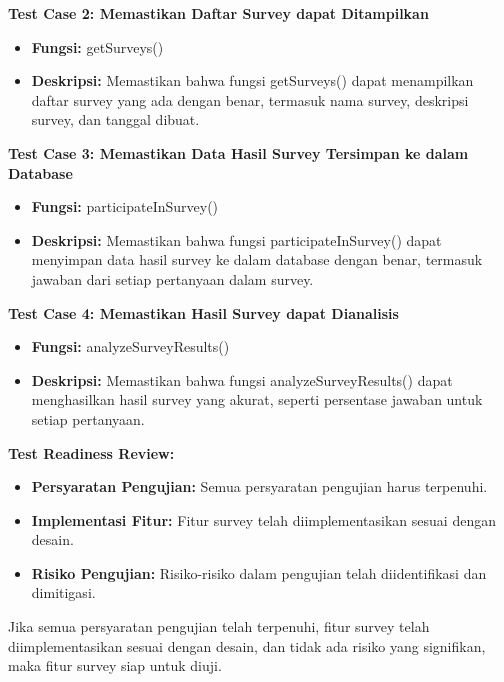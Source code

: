 \documentclass[12pt]{article}
\begin{document}
\textbf{Test Case 2: Memastikan Daftar Survey dapat Ditampilkan}

\begin{itemize}
    \item \textbf{Fungsi:} getSurveys()
    \item \textbf{Deskripsi:} Memastikan bahwa fungsi getSurveys() dapat menampilkan daftar survey yang ada dengan benar, termasuk nama survey, deskripsi survey, dan tanggal dibuat.
\end{itemize}

\textbf{Test Case 3: Memastikan Data Hasil Survey Tersimpan ke dalam Database}

\begin{itemize}
    \item \textbf{Fungsi:} participateInSurvey()
    \item \textbf{Deskripsi:} Memastikan bahwa fungsi participateInSurvey() dapat menyimpan data hasil survey ke dalam database dengan benar, termasuk jawaban dari setiap pertanyaan dalam survey.
\end{itemize}

\textbf{Test Case 4: Memastikan Hasil Survey dapat Dianalisis}

\begin{itemize}
    \item \textbf{Fungsi:} analyzeSurveyResults()
    \item \textbf{Deskripsi:} Memastikan bahwa fungsi analyzeSurveyResults() dapat menghasilkan hasil survey yang akurat, seperti persentase jawaban untuk setiap pertanyaan.
\end{itemize}

\textbf{Test Readiness Review:}

\begin{itemize}
    \item \textbf{Persyaratan Pengujian:} Semua persyaratan pengujian harus terpenuhi.
    \item \textbf{Implementasi Fitur:} Fitur survey telah diimplementasikan sesuai dengan desain.
    \item \textbf{Risiko Pengujian:} Risiko-risiko dalam pengujian telah diidentifikasi dan dimitigasi.
\end{itemize}

Jika semua persyaratan pengujian telah terpenuhi, fitur survey telah diimplementasikan sesuai dengan desain, dan tidak ada risiko yang signifikan, maka fitur survey siap untuk diuji.

\end{document}
